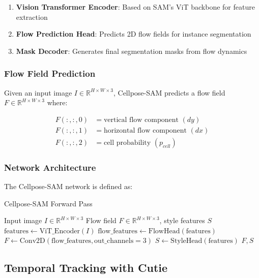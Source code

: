 \documentclass[12pt]{article}
\begin{document}
\begin{enumerate}
  \item \textbf{Vision Transformer Encoder}: Based on SAM's ViT backbone for feature extraction
  \item \textbf{Flow Prediction Head}: Predicts 2D flow fields for instance segmentation
  \item \textbf{Mask Decoder}: Generates final segmentation masks from flow dynamics
\end{enumerate}

\subsubsection{Flow Field Prediction}

Given an input image $I \in \mathbb{R}^{H \times W \times 3}$, Cellpose-SAM predicts a flow field $F \in \mathbb{R}^{H \times W \times 3}$ where:

\begin{align}
  F(:,:,0) & = \text{vertical flow component } (dy)   \\
  F(:,:,1) & = \text{horizontal flow component } (dx) \\
  F(:,:,2) & = \text{cell probability } (p_{cell})
\end{align}

\subsubsection{Network Architecture}

The Cellpose-SAM network is defined as:

\begin{algorithm}[H]
  \caption{Cellpose-SAM Forward Pass}
  \begin{algorithmic}[1]
    \REQUIRE Input image $I \in \mathbb{R}^{H \times W \times 3}$
    \ENSURE Flow field $F \in \mathbb{R}^{H \times W \times 3}$, style features $S$
    \STATE $\text{features} \leftarrow \text{ViT\_Encoder}(I)$
    \STATE $\text{flow\_features} \leftarrow \text{FlowHead}(\text{features})$
    \STATE $F \leftarrow \text{Conv2D}(\text{flow\_features}, \text{out\_channels}=3)$
    \STATE $S \leftarrow \text{StyleHead}(\text{features})$
    \RETURN $F, S$
  \end{algorithmic}
\end{algorithm}

\subsection{Temporal Tracking with Cutie}
\end{document}
